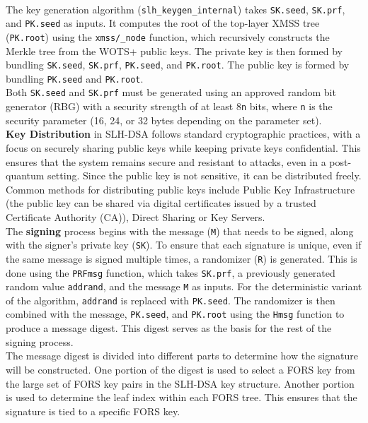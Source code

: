 \documentclass[journal=tosc,notanonymous]{iacrtrans}
\begin{document}
\\
The key generation algorithm (\verb|slh_keygen_internal|) takes \texttt{SK.seed}, \texttt{SK.prf}, and \texttt{PK.seed} as inputs.
It computes the root of the top-layer XMSS tree (\texttt{PK.root}) using the \verb|xmss/_node| function, which recursively constructs the Merkle tree from the WOTS+ public keys.
The private key is then formed by bundling \texttt{SK.seed}, \texttt{SK.prf}, \texttt{PK.seed}, and \texttt{PK.root}.
The public key is formed by bundling \texttt{PK.seed} and \texttt{PK.root}.
\\
Both \texttt{SK.seed} and \texttt{SK.prf} must be generated using an approved random bit generator (RBG) with a security strength of at least 8\texttt{n} bits, where \texttt{n} is the security parameter (16, 24, or 32 bytes depending on the parameter set).\\
\newline
\textbf{Key Distribution} in SLH-DSA follows standard cryptographic practices, with a focus on securely sharing public keys while keeping private keys confidential. This ensures that the system remains secure and resistant to attacks, even in a post-quantum setting. Since the public key is not sensitive, it can be distributed freely. Common methods for distributing public keys include Public Key Infrastructure (the public key can be shared via digital certificates issued by a trusted Certificate Authority (CA)), Direct Sharing or Key Servers.\\
\newline
The \textbf{signing} process begins with the message (\texttt{M}) that needs to be signed, along with the signer's private key (\texttt{SK}). 
To ensure that each signature is unique, even if the same message is signed multiple times, a randomizer (\texttt{R}) is generated. This is done using the \texttt{PRFmsg} function, which takes \texttt{SK.prf}, a previously generated random value \texttt{addrand}, and the message \texttt{M} as inputs. For the deterministic variant of the algorithm, \texttt{addrand} is replaced with \texttt{PK.seed}. The randomizer is then combined with the message, \texttt{PK.seed}, and \texttt{PK.root} using the \texttt{Hmsg} function to produce a message digest. This digest serves as the basis for the rest of the signing process.\\
The message digest is divided into different parts to determine how the signature will be constructed. One portion of the digest is used to select a FORS key from the large set of FORS key pairs in the SLH-DSA key structure. Another portion is used to determine the leaf index within each FORS tree. This ensures that the signature is tied to a specific FORS key.\\
\end{document}
